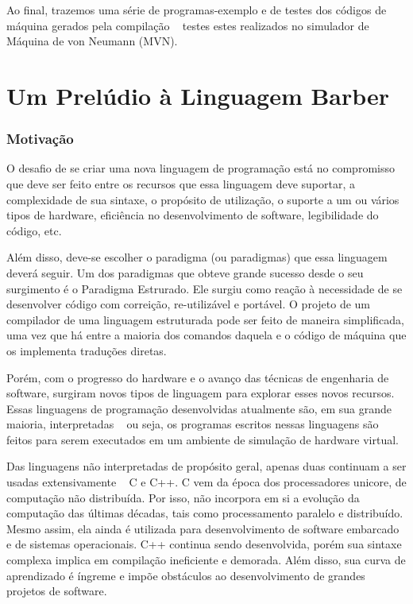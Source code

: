 \documentclass[a4paper,12pt]{report}
\begin{document}
    Ao final, trazemos uma série de programas-exemplo e de testes dos códigos de máquina gerados pela compilação \textemdash ~ testes estes realizados no simulador de Máquina de von Neumann (MVN).
    
    \part*{Um Prelúdio à Linguagem Barber}

    \section*{Motivação}
    O desafio de se criar uma nova linguagem de programação está no compromisso que deve ser feito entre os recursos que essa linguagem deve suportar, a complexidade de sua sintaxe, o propósito de utilização, o suporte a um ou vários tipos de hardware, eficiência no desenvolvimento de software, legibilidade do código, etc.

    Além disso, deve-se escolher o paradigma (ou paradigmas) que essa linguagem deverá seguir. Um dos paradigmas que obteve grande sucesso desde o seu surgimento é o Paradigma Estrurado. Ele surgiu como reação à necessidade de se desenvolver código com correição, re-utilizável e portável. O projeto de um compilador de uma linguagem estruturada pode ser feito de maneira simplificada, uma vez que há entre a maioria dos comandos daquela e o código de máquina que os implementa traduções diretas.  
    
    Porém, com o progresso do hardware e o avanço das técnicas de engenharia de software, surgiram novos tipos de linguagem para explorar esses novos recursos. Essas linguagens de programação desenvolvidas atualmente são, em sua grande maioria, interpretadas \textemdash ~ ou seja, os programas escritos nessas linguagens são feitos para serem executados em um ambiente de simulação de hardware virtual.

    Das linguagens não interpretadas de propósito geral, apenas duas continuam a ser usadas extensivamente \textemdash ~ C e C++. C vem da época dos processadores unicore, de computação não distribuída. Por isso, não incorpora em si a evolução da computação das últimas décadas, tais como processamento paralelo e distribuído. Mesmo assim, ela ainda é utilizada para desenvolvimento de software embarcado e de sistemas operacionais. C++ continua sendo desenvolvida, porém sua sintaxe complexa implica em compilação ineficiente e demorada. Além disso, sua curva de aprendizado é íngreme e impõe obstáculos ao desenvolvimento de grandes projetos de software.
\end{document}
